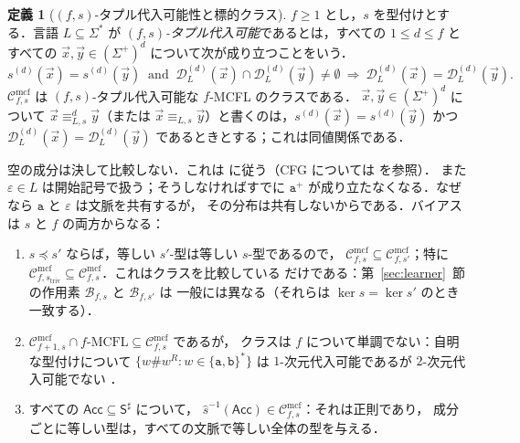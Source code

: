 \documentclass[11pt,a4paper]{ltjsarticle}
\numberwithin{equation}{section}
\theoremstyle{plain}
\theoremstyle{definition}
\newtheorem{definition}[theorem]{定義}
\theoremstyle{remark}
\newcommand{\Cmcf}[2]{\mathcal{C}^{\mathrm{mcf}}_{#1,#2}}
\newcommand{\D}{\mathcal{D}}
\newcommand{\tuple}[1]{\vec{#1}}
\newcommand{\eps}{\varepsilon}
\theoremstyle{plain}
\begin{document}
\begin{definition}[$(f,s)$-タプル代入可能性と標的クラス]
\label{def:tuple-substitutable}
\label{def:class-cmcf}
$f\ge1$ とし，$s$ を型付けとする．言語 $L\subseteq\Sigma^*$ が
\emph{$(f,s)$-タプル代入可能}であるとは，すべての $1\le d\le f$ とすべての
$\tuple x,\tuple y\in(\Sigma^+)^d$ について次が成り立つことをいう．
\[
 s^{(d)}(\tuple x)=s^{(d)}(\tuple y)\ \text{ and }\
 \D_L^{(d)}(\tuple x)\cap\D_L^{(d)}(\tuple y)\ne\emptyset
 \ \Longrightarrow\
 \D_L^{(d)}(\tuple x)=\D_L^{(d)}(\tuple y).
\]
$\Cmcf{f}{s}$ は $(f,s)$-タプル代入可能な $f$-MCFL のクラスである．
$\tuple x,\tuple y\in(\Sigma^+)^d$ について $\tuple x\equiv_{L,s}^d\tuple y$（または
$\tuple x\equiv_{L,s}\tuple y$）と書くのは，$s^{(d)}(\tuple x)=s^{(d)}(\tuple y)$ かつ
$\D_L^{(d)}(\tuple x)=\D_L^{(d)}(\tuple y)$ であるときとする；これは同値関係である．
\end{definition}

空の成分は決して比較しない．これは
\cite[Section~3.1 and footnote~3]{Yoshinaka2011} に従う（CFG については \cite{Clark2013} を参照）．
また $\eps\in L$ は開始記号で扱う；そうしなければすでに
$\mathtt a^+$ が成り立たなくなる．なぜなら $\mathtt a$ と $\eps$ は文脈を共有するが，
その分布は共有しないからである．バイアスは $s$ と $f$ の両方からなる：
\begin{enumerate}[label=\textup{(\alph*)},leftmargin=*]
\item $s\preceq s'$ ならば，等しい $s'$-型は等しい $s$-型であるので，
$\Cmcf{f}{s}\subseteq\Cmcf{f}{s'}$；特に
$\Cmcf{f}{s_{\mathrm{triv}}}\subseteq\Cmcf{f}{s}$．これはクラスを比較している
だけである：第~\ref{sec:learner}~節の作用素 $\mathcal B_{f,s}$ と $\mathcal B_{f,s'}$ は
一般には異なる（それらは
$\ker s=\ker s'$ のとき一致する）．
\item $\Cmcf{f+1}{s}\cap f\text{-}\mathrm{MCFL}\subseteq\Cmcf{f}{s}$ であるが，
クラスは $f$ について単調でない：自明な型付けについて
$\{w\mathtt{\#}w^R:w\in\{\mathtt a,\mathtt b\}^*\}$ は
$1$-次元代入可能であるが $2$-次元代入可能でない
\cite[Section~3.1, Example~5]{Yoshinaka2011}．
\item すべての $\mathsf{Acc}\subseteq\mathsf S^\sharp$ について，
$\widehat{s}^{-1}(\mathsf{Acc})\in\Cmcf{f}{s}$：それは正則であり，
成分ごとに等しい型は，すべての文脈で等しい全体の型を与える．
\end{enumerate}
\end{document}
